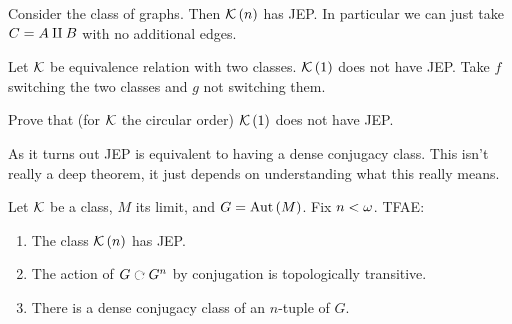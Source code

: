 \documentclass{amsart}
\begin{document}
\begin{exm}
Consider the class of graphs. 
Then $\mathcal{K}\left(n\right)$ has JEP. In particular we can just take $C = A\amalg B$ with no
additional edges.
\end{exm}

\begin{cexm}
Let $\mathcal{K}$ be equivalence relation with two classes. 
$\mathcal{K}\left(1\right)$ does not have JEP. Take $f$ switching the two classes and $g$ not
switching them.
\end{cexm}

\begin{exr}
Prove that (for $\mathcal{K}$ the circular order) $\mathcal{K}\left(1\right)$ does not have JEP.
\end{exr}

As it turns out JEP is equivalent to having a
dense conjugacy class. This isn't really a deep theorem, it just depends on understanding
what this really means. 

\begin{prop}
Let $\mathcal{K}$ be a \Fraisse class, $M$ its limit, and $G = \operatorname{Aut}\left(M\right)$. Fix $n < \omega$. 
TFAE:
\begin{enumerate}[label = (\iii)]
\item The class $\mathcal{K}\left(n\right)$ has JEP.
\item The action of $G\acts G^n$ by conjugation is topologically transitive.
\item There is a dense conjugacy class of an $n$-tuple of $G$.
\end{enumerate}
\end{prop}
\end{document}
